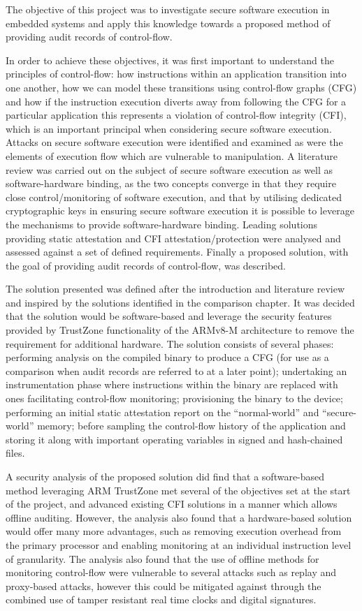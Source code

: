 The objective of this project was to investigate secure software execution in embedded systems and apply this knowledge towards a proposed method of providing audit records of control-flow.

In order to achieve these objectives, it was first important to understand the principles of control-flow: how instructions within an application transition into one another, how we can model these transitions using control-flow graphs (CFG) and how if the instruction execution diverts away from following the CFG for a particular application this represents a violation of control-flow integrity (CFI), which is an important principal when considering secure software execution. Attacks on secure software execution were identified and examined as were the elements of execution flow which are vulnerable to manipulation. A literature review was carried out on the subject of secure software execution as well as software-hardware binding, as the two concepts converge in that they require close control\slash monitoring of software execution, and that by utilising dedicated cryptographic keys in ensuring secure software execution it is possible to leverage the mechanisms to provide software-hardware binding. Leading solutions providing static attestation and CFI attestation\slash protection were analysed and assessed against a set of defined requirements. Finally a proposed solution, with the goal of providing audit records of control-flow, was described.

The solution presented was defined after the introduction and literature review and inspired by the solutions identified in the comparison chapter. It was decided that the solution would be software-based and leverage the security features provided by TrustZone functionality of the ARMv8-M architecture to remove the requirement for additional hardware. The solution consists of several phases: performing analysis on the compiled binary to produce a CFG (for use as a comparison when audit records are referred to at a later point); undertaking an instrumentation phase where instructions within the binary are replaced with ones facilitating control-flow monitoring; provisioning the binary to the device; performing an initial static attestation report on the ``normal-world'' and ``secure-world'' memory; before sampling the control-flow history of the application and storing it along with important operating variables in signed and hash-chained files.

A security analysis of the proposed solution did find that a software-based method leveraging ARM TrustZone met several of the objectives set at the start of the project, and advanced existing CFI solutions in a manner which allows offline auditing. However, the analysis also found that a hardware-based solution would offer many more advantages, such as removing execution overhead from the primary processor and enabling monitoring at an individual instruction level of granularity. The analysis also found that the use of offline methods for monitoring control-flow were vulnerable to several attacks such as replay and proxy-based attacks, however this could be mitigated against through the combined use of tamper resistant real time clocks and digital signatures.

